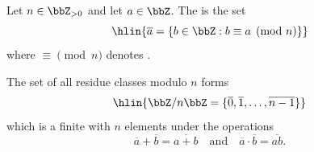 \begin{definition} \label{definition:residue_class_modulo_n}
    Let $n \in \bbZ_{>0}$ and let $a \in \bbZ$. The  is the set
    $$\hlin{\overline{a} = \{ b \in \bbZ : b \equiv a \pmod{n} \}}$$
    where $\equiv \pmod{n}$ denotes .

    The set of all residue classes modulo $n$ forms
    $$\hlin{\bbZ / n\bbZ = \{ \overline{0}, \overline{1}, \dots, \overline{n-1} \}}$$
    which is a finite  with $n$ elements under the operations
    $$\overline{a} + \overline{b} = \overline{a + b} \quad \text{and} \quad \overline{a} \cdot \overline{b} = \overline{ab}.$$
\end{definition}
